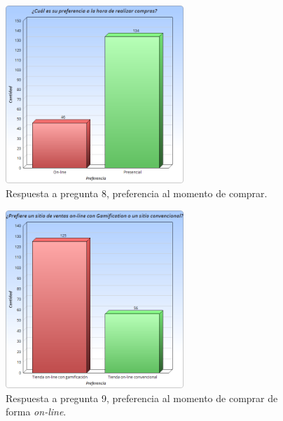 \begin{figure}[!htb]
  \centering
  \includegraphics[width=0.6\textwidth]{images/Graficos/graf_5_9.png}
  \caption[chart5.9]{Respuesta a pregunta 8, preferencia al momento de comprar.}
  \label{fig:chart5.9}
\end{figure}

\begin{figure}[!htb]
  \centering
  \includegraphics[width=0.6\textwidth]{images/Graficos/graf_5_10.png}
  \caption[chart5.10]{Respuesta a pregunta 9, preferencia al momento de comprar de forma \emph{on-line}.}
  \label{fig:chart5.10}
\end{figure}

